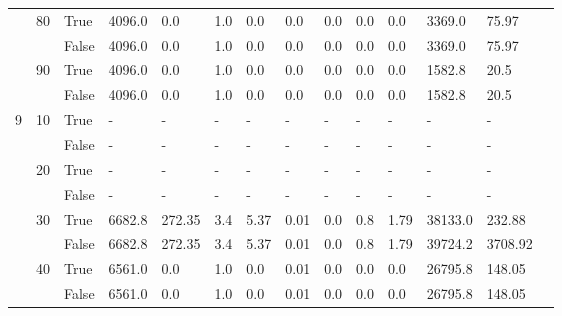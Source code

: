 \begin{landscape}
\begin{small}
\begin{longtable}[c]{@{}lll|ll|ll|ll|ll|lll@{}}
   & 80 & True  & 4096.0          & 0.0            & 1.0           & 0.0           & 0.0           & 0.0           & 0.0           & 0.0           & 3369.0        & 75.97       &  \\
   &    & False & 4096.0          & 0.0            & 1.0           & 0.0           & 0.0           & 0.0           & 0.0           & 0.0           & 3369.0        & 75.97       &  \\
   & 90 & True  & 4096.0          & 0.0            & 1.0           & 0.0           & 0.0           & 0.0           & 0.0           & 0.0           & 1582.8        & 20.5        &  \\
   &    & False & 4096.0          & 0.0            & 1.0           & 0.0           & 0.0           & 0.0           & 0.0           & 0.0           & 1582.8        & 20.5        &  \\
  \midrule
9  & 10 & True  & -               & -              & -             & -             & -             & -             & -             & -             & -             & -           &  \\
   &    & False & -               & -              & -             & -             & -             & -             & -             & -             & -             & -           &  \\
   & 20 & True  & -               & -              & -             & -             & -             & -             & -             & -             & -             & -           &  \\
   &    & False & -               & -              & -             & -             & -             & -             & -             & -             & -             & -           &  \\
   & 30 & True  & 6682.8          & 272.35         & 3.4           & 5.37          & 0.01          & 0.0           & 0.8           & 1.79          & 38133.0       & 232.88      &  \\
   &    & False & 6682.8          & 272.35         & 3.4           & 5.37          & 0.01          & 0.0           & 0.8           & 1.79          & 39724.2       & 3708.92     &  \\
   & 40 & True  & 6561.0          & 0.0            & 1.0           & 0.0           & 0.01          & 0.0           & 0.0           & 0.0           & 26795.8       & 148.05      &  \\
   &    & False & 6561.0          & 0.0            & 1.0           & 0.0           & 0.01          & 0.0           & 0.0           & 0.0           & 26795.8       & 148.05      &  \\

\end{longtable}
\end{small}
\end{landscape}
